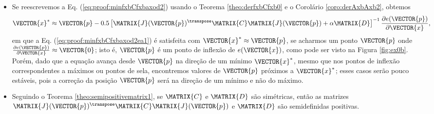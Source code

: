 \begin{myproofT}
\begin{itemize}
\item Se reescrevemos a Eq. (\ref{eq:proof:minfxbCfxbaxod2}) usando o Teorema \ref{theo:derfxbCfxb0}
e o Corolário \ref{coro:derAxbAxb2},
obtemos
\begin{equation}\label{eq:proof:minfxbCfxbaxod2ea1}
\VECTOR{x}^* \approx \VECTOR{p} -
0.5 \left[ \MATRIX{J}(\VECTOR{p})^{\transpose}\MATRIX{C} \MATRIX{J}(\VECTOR{p})+\alpha \MATRIX{D} \right]^{-1}
\frac{\partial e(\VECTOR{p})}{\partial \VECTOR{x} },
\end{equation}
em que a Eq. (\ref{eq:proof:minfxbCfxbaxod2ea1}) é satisfeita 
com $\VECTOR{x}^* \approx \VECTOR{p}$, 
se acharmos um  ponto $\VECTOR{p}$ onde  
$\frac{\partial e(\VECTOR{p})}{\partial \VECTOR{x} }\approx \VECTOR{0}$; 
isto é, $\VECTOR{p}$ é um ponto de inflexão de $e(\VECTOR{x})$, 
como pode ser visto na Figura \ref{fig:ex0b}.
Porém, dado que a equação avança desde $\VECTOR{p}$ na direção de um mínimo $\VECTOR{x}^*$, 
mesmo que nos pontos de inflexão correspondentes a máximos ou pontos de sela,
encontremos valores de $\VECTOR{p}$ próximos a $\VECTOR{x}^*$;
 esses casos serão pouco estáveis, pois
a correção da posição $\VECTOR{p}$ será na direção de um mínimo e não do máximo.
\item Seguindo o Teorema \ref{theo:semipositivematrix1}, se $\MATRIX{C}$ e $\MATRIX{D}$ são simétricas, 
então as matrizes $\MATRIX{J}(\VECTOR{p})^{\transpose}\MATRIX{C} \MATRIX{J}(\VECTOR{p})$ e $\MATRIX{D}$
são semidefinidas positivas.


\end{itemize}
\end{myproofT}
